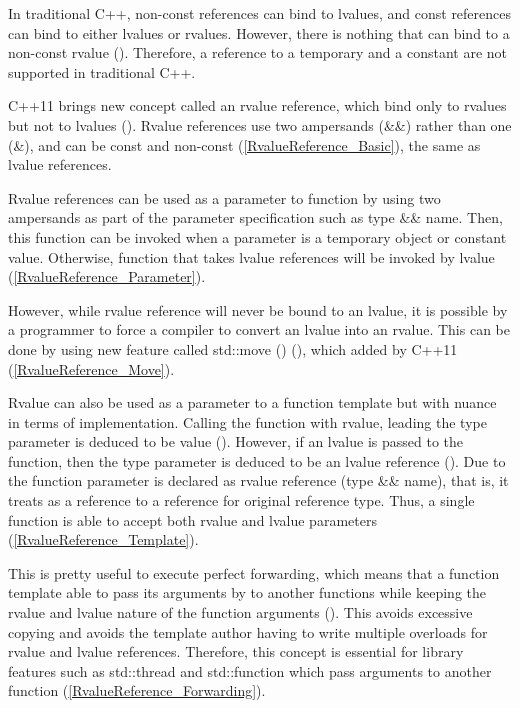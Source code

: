 \documentclass[11pt]{report}
\begin{document}
In traditional C++, non-const references can bind to lvalues, and const references can bind to either lvalues or rvalues. However, there is nothing that can bind to a non-const rvalue (\cite{Stroustrup:2012:Cpp11}). Therefore, a reference to a temporary and a constant are not supported in traditional C++.

C++11 brings new concept called an rvalue reference, which bind only to rvalues but not to lvalues (\cite{Gregorie:professionalcpp}). Rvalue references use two ampersands (\&\&) rather than one (\&), and can be const and non-const (\ref{RvalueReference_Basic}), the same as lvalue references.

Rvalue references can be used as a parameter to function by using two ampersands as part of the parameter specification such as type \&\& name. Then, this function can be invoked when a parameter is a temporary object or constant value. Otherwise, function that takes lvalue references will be invoked by lvalue (\ref{RvalueReference_Parameter}).

However, while rvalue reference will never be bound to an lvalue, it is possible by a programmer to force a compiler to convert an lvalue into an rvalue. This can be done by using new feature called std::move () (\cite{Gregorie:professionalcpp}), which added by C++11 (\ref{RvalueReference_Move}).

Rvalue can also be used as a parameter to a function template but with nuance in terms of implementation. Calling the function with rvalue, leading the type parameter is deduced to be value (\cite{Williams:2012:CCA}). However, if an lvalue is passed to the function, then the type parameter is deduced to be an lvalue reference (\cite{Williams:2012:CCA}). Due to the function parameter is declared as rvalue reference (type \&\& name), that is, it treats as a reference to a reference for original reference type. Thus, a single function is able to accept both rvalue and lvalue parameters (\ref{RvalueReference_Template}).

This is pretty useful to execute perfect forwarding, which means that a function template able to pass its arguments by to another functions while keeping the rvalue and lvalue nature of the function arguments (\cite{Williams:2012:CCA}). This avoids excessive copying and avoids the template author having to write multiple overloads for rvalue and lvalue references. Therefore, this concept is essential for library features such as std::thread and std::function which pass arguments to another function (\ref{RvalueReference_Forwarding}).
\end{document}
